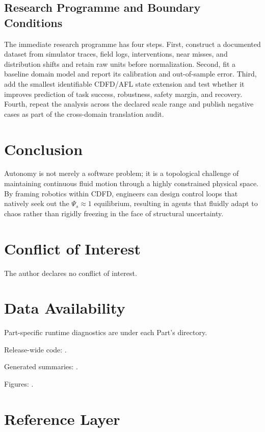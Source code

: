 \documentclass[11pt,a4paper]{article}
\begin{document}
\subsection{Research Programme and Boundary Conditions}

The immediate research programme has four steps. First, construct a documented
dataset from simulator traces, field logs, interventions, near misses, and distribution shifts and retain raw units before normalization.
Second, fit a baseline domain model and report its calibration and out-of-sample
error. Third, add the smallest identifiable CDFD/AFL state extension and test
whether it improves prediction of task success, robustness, safety margin, and recovery. Fourth, repeat the
analysis across the declared scale range and publish negative cases as part of
the cross-domain translation audit.


\section{Conclusion}
Autonomy is not merely a software problem; it is a topological challenge of maintaining continuous fluid motion through a highly constrained physical space. By framing robotics within CDFD, engineers can design control loops that natively seek out the $\Psi_s \approx 1$ equilibrium, resulting in agents that fluidly adapt to chaos rather than rigidly freezing in the face of structural uncertainty.
\section*{Conflict of Interest} The author declares no conflict of interest.
\section*{Data Availability}
Part-specific runtime diagnostics are under each Part's  directory.

Release-wide code: .

Generated summaries: .

Figures: .


\section{Reference Layer}


\end{document}
